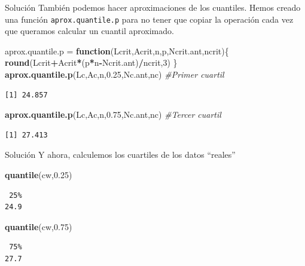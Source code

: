 \documentclass[
  ignorenonframetext,
]{beamer}
\newenvironment{Shaded}{\begin{snugshade}}{\end{snugshade}}
\newcommand{\CommentTok}[1]{\textcolor[rgb]{0.56,0.35,0.01}{\textit{#1}}}
\newcommand{\ControlFlowTok}[1]{\textcolor[rgb]{0.13,0.29,0.53}{\textbf{#1}}}
\newcommand{\DecValTok}[1]{\textcolor[rgb]{0.00,0.00,0.81}{#1}}
\newcommand{\FloatTok}[1]{\textcolor[rgb]{0.00,0.00,0.81}{#1}}
\newcommand{\FunctionTok}[1]{\textcolor[rgb]{0.13,0.29,0.53}{\textbf{#1}}}
\newcommand{\NormalTok}[1]{#1}
\newcommand{\OtherTok}[1]{\textcolor[rgb]{0.56,0.35,0.01}{#1}}
\newcommand{\SpecialCharTok}[1]{\textcolor[rgb]{0.81,0.36,0.00}{\textbf{#1}}}
\begin{document}
\begin{frame}[fragile]{Solución}
\label{soluciuxf3n-35}
También podemos hacer aproximaciones de los cuantiles. Hemos creado una
función \texttt{aprox.quantile.p} para no tener que copiar la operación
cada vez que queramos calcular un cuantil aproximado.

\begin{Shaded}
\begin{Highlighting}[]
\NormalTok{aprox.quantile.p }\OtherTok{=} \ControlFlowTok{function}\NormalTok{(Lcrit,Acrit,n,p,Ncrit.ant,ncrit)\{}
  \FunctionTok{round}\NormalTok{(Lcrit}\SpecialCharTok{+}\NormalTok{Acrit}\SpecialCharTok{*}\NormalTok{(p}\SpecialCharTok{*}\NormalTok{n}\SpecialCharTok{{-}}\NormalTok{Ncrit.ant)}\SpecialCharTok{/}\NormalTok{ncrit,}\DecValTok{3}\NormalTok{)}
\NormalTok{\}}
\FunctionTok{aprox.quantile.p}\NormalTok{(Lc,Ac,n,}\FloatTok{0.25}\NormalTok{,Nc.ant,nc) }\CommentTok{\#Primer cuartil}
\end{Highlighting}
\end{Shaded}

\begin{verbatim}
[1] 24.857
\end{verbatim}

\begin{Shaded}
\begin{Highlighting}[]
\FunctionTok{aprox.quantile.p}\NormalTok{(Lc,Ac,n,}\FloatTok{0.75}\NormalTok{,Nc.ant,nc) }\CommentTok{\#Tercer cuartil}
\end{Highlighting}
\end{Shaded}

\begin{verbatim}
[1] 27.413
\end{verbatim}
\end{frame}

\begin{frame}[fragile]{Solución}
\label{soluciuxf3n-36}
Y ahora, calculemos los cuartiles de los datos ``reales''

\begin{Shaded}
\begin{Highlighting}[]
\FunctionTok{quantile}\NormalTok{(cw,}\FloatTok{0.25}\NormalTok{)}
\end{Highlighting}
\end{Shaded}

\begin{verbatim}
 25% 
24.9 
\end{verbatim}

\begin{Shaded}
\begin{Highlighting}[]
\FunctionTok{quantile}\NormalTok{(cw,}\FloatTok{0.75}\NormalTok{)}
\end{Highlighting}
\end{Shaded}

\begin{verbatim}
 75% 
27.7 
\end{verbatim}
\end{frame}
\end{document}
